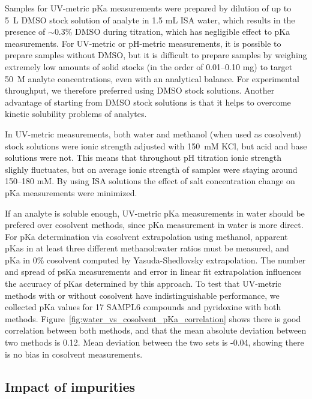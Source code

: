 \documentclass[9pt,lineno]{elife}
\begin{document}
Samples for UV-metric pKa measurements were prepared by dilution of up to 5~\micro L DMSO stock solution of analyte in 1.5 mL ISA water, which results in the presence of $\sim$0.3\% DMSO during titration, which has negligible effect to pKa measurements. 
For UV-metric or pH-metric measurements, it is possible to prepare samples without DMSO, but it is difficult to prepare samples by weighing extremely low amounts of solid stocks (in the order of 0.01--0.10 mg) to target 50~{\micro}M analyte concentrations, even with an analytical balance. 
For experimental throughput, we therefore preferred using DMSO stock solutions. 
Another advantage of starting from DMSO stock solutions is that it helps to overcome kinetic solubility problems of analytes.

In UV-metric measurements, both water and methanol (when used as cosolvent) stock solutions were ionic strength adjusted with 150~mM KCl, but acid and base solutions were not. This means that throughout pH titration ionic strength slighly fluctuates, but on average ionic strength of samples were staying around 150--180 mM. By using ISA solutions the effect of salt concentration change on pKa measurements were minimized.

If an analyte is soluble enough, UV-metric pKa measurements in water should be prefered over cosolvent methods, since pKa measurement in water is more direct. 
For pKa determination via cosolvent extrapolation using methanol, apparent pKas in at least three different methanol:water ratios must be measured, and pKa in 0\% cosolvent computed by Yasuda-Shedlovsky extrapolation. 
The number and spread of psKa measurements and error in linear fit extrapolation influences the accuracy of pKas determined by this approach. 
To test that UV-metric methods with or without cosolvent have indistinguishable performance, we collected pKa values for 17 SAMPL6 compounds and pyridoxine with both methods. 
Figure~\ref{fig:water_vs_cosolvent_pKa_correlation} shows there is good correlation between both methods, and that the mean absolute deviation between two methods is 0.12. Mean deviation between the two sets is -0.04, showing there is no bias in cosolvent measurements.

\subsection{Impact of impurities}
\end{document}
